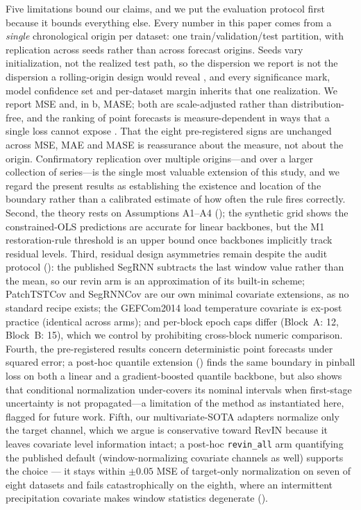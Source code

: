 Five limitations bound our claims, and we put the evaluation protocol first because it bounds everything else. Every number in this paper comes from a \emph{single} chronological origin per dataset: one train/validation/test partition, with replication across seeds rather than across forecast origins. Seeds vary initialization, not the realized test path, so the dispersion we report is not the dispersion a rolling-origin design would reveal \citep{tashman2000out}, and every significance mark, model confidence set and per-dataset margin inherits that one realization. We report MSE and, in b, MASE; both are scale-adjusted rather than distribution-free, and the ranking of point forecasts is measure-dependent in ways that a single loss cannot expose \citep{kolassa2020why, hyndman2006another}. That the eight pre-registered signs are unchanged across MSE, MAE and MASE is reassurance about the measure, not about the origin. Confirmatory replication over multiple origins---and over a larger collection of series---is the single most valuable extension of this study, and we regard the present results as establishing the existence and location of the boundary rather than a calibrated estimate of how often the rule fires correctly. Second, the theory rests on Assumptions A1--A4 (); the synthetic grid shows the constrained-OLS predictions are accurate for linear backbones, but the M1 restoration-rule threshold is an upper bound once backbones implicitly track residual levels. Third, residual design asymmetries remain despite the audit protocol (): the published SegRNN subtracts the last window value rather than the mean, so our revin arm is an approximation of its built-in scheme; PatchTSTCov and SegRNNCov are our own minimal covariate extensions, as no standard recipe exists; the GEFCom2014 load temperature covariate is ex-post practice (identical across arms); and per-block epoch caps differ (Block~A: 12, Block~B: 15), which we control by prohibiting cross-block numeric comparison. Fourth, the pre-registered results concern deterministic point forecasts under squared error; a post-hoc quantile extension () finds the same boundary in pinball loss on both a linear and a gradient-boosted quantile backbone, but also shows that conditional normalization under-covers its nominal intervals when first-stage uncertainty is not propagated---a limitation of the method as instantiated here, flagged for future work. Fifth, our multivariate-SOTA adapters normalize only the target channel, which we argue is conservative toward RevIN because it leaves covariate level information intact; a post-hoc \texttt{revin\_all} arm quantifying the published default (window-normalizing covariate channels as well) supports the choice --- it stays within $\pm 0.05$ MSE of target-only normalization on seven of eight datasets and fails catastrophically on the eighth, where an intermittent precipitation covariate makes window statistics degenerate ().

